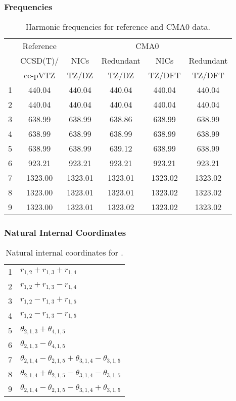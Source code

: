 \documentclass[10pt,oneside]{article}
\begin{document}
\begin{table}[h!]
\subsubsection*{Frequencies}
\centering
\caption{Harmonic frequencies for reference and CMA0 data.}
\begin{tabular}{cccccc}
\toprule
{} & Reference & \multicolumn{4}{c}{CMA0} \\
{} &  CCSD(T)/ &    NICs &  Redundant &    NICs & Redundant \\
{} &   cc-pVTZ &   TZ/DZ &      TZ/DZ &  TZ/DFT &    TZ/DFT \\
\midrule
1 &    440.04 &  440.04 &     440.04 &  440.04 &    440.04 \\
2 &    440.04 &  440.04 &     440.04 &  440.04 &    440.04 \\
3 &    638.99 &  638.99 &     638.86 &  638.99 &    638.99 \\
4 &    638.99 &  638.99 &     638.99 &  638.99 &    638.99 \\
5 &    638.99 &  638.99 &     639.12 &  638.99 &    638.99 \\
6 &    923.21 &  923.21 &     923.21 &  923.21 &    923.21 \\
7 &   1323.00 & 1323.01 &    1323.01 & 1323.02 &   1323.02 \\
8 &   1323.00 & 1323.01 &    1323.01 & 1323.02 &   1323.02 \\
9 &   1323.00 & 1323.01 &    1323.02 & 1323.02 &   1323.02 \\
\bottomrule
\end{tabular}
\end{table}

\begin{table}[h!]
\subsubsection*{Natural Internal Coordinates}
\centering
\caption{Natural internal coordinates for .}
\small
\begin{tabular}{ll}
\toprule
  1   & $r_{1,2} + r_{1,3} + r_{1,4}$ \\
  2   & $r_{1,2} + r_{1,3} - r_{1,4}$ \\
  3   & $r_{1,2} - r_{1,3} + r_{1,5}$ \\
  4   & $r_{1,2} - r_{1,3} - r_{1,5}$ \\
  5   & $\theta_{2,1,3} + \theta_{4,1,5}$ \\
  6   & $\theta_{2,1,3} - \theta_{4,1,5}$ \\
  7   & $\theta_{2,1,4} - \theta_{2,1,5} + \theta_{3,1,4} - \theta_{3,1,5}$ \\
  8   & $\theta_{2,1,4} + \theta_{2,1,5} - \theta_{3,1,4} - \theta_{3,1,5}$ \\
  9   & $\theta_{2,1,4} - \theta_{2,1,5} - \theta_{3,1,4} + \theta_{3,1,5}$ \\
\bottomrule
\end{tabular}
\end{table}
\end{document}
